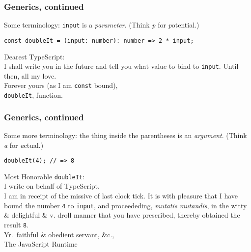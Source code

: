 \documentclass{beamer}
\begin{document}
\begin{frame}[fragile]
  \frametitle{Generics, continued}

  Some terminology: \texttt{input} is a \textit{parameter}. (Think \textit{p}
  for \textit{p}otential.) \\

  \begin{verbatim}
const doubleIt = (input: number): number => 2 * input;
  \end{verbatim}

  \vspace{1em}

  \begin{tcolorbox}
    Dearest TypeScript: \\

    I shall write you in the future and tell you what value to bind to
    \texttt{input}. Until then, all my love. \\

    Forever yours (as I am \texttt{const} bound), \\
    \texttt{doubleIt}, function.
  \end{tcolorbox}
\end{frame}

\begin{frame}[fragile]
  \frametitle{Generics, continued}

  Some more terminology: the thing inside the parentheses is an
  \textit{argument}. (Think \textit{a} for \textit{a}ctual.)

  \vspace{1em}

  \begin{verbatim}
doubleIt(4); // => 8
  \end{verbatim}

  \vspace{1em}

  \begin{tcolorbox}
    \small
    Most Honorable \texttt{doubleIt}: \\

    I write on behalf of TypeScript. \\

    I am in receipt of the missive of last clock tick. It is with pleasure that
    I have bound the number \texttt{4} to \texttt{input}, and proceededing,
    \textit{mutatis mutandis}, in the witty \& delightful \& v. droll manner
    that you have prescribed, thereby obtained the result \texttt{8}. \\

    Yr.\ faithful \& obedient servant, \&c., \\
    The JavaScript Runtime \\
  \end{tcolorbox}
\end{frame}
\end{document}
